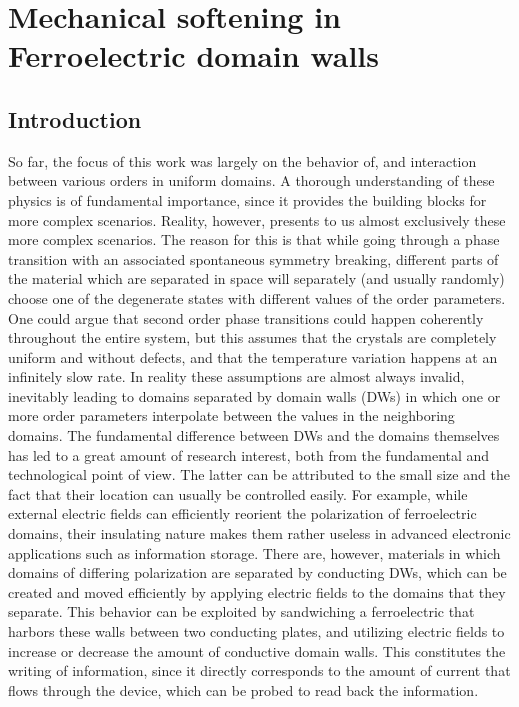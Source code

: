 \chapter{Mechanical softening in Ferroelectric domain walls}


\section{Introduction}
So far, the focus of this work was largely on the behavior of, and interaction between various orders in uniform domains.
A thorough understanding of these physics is of fundamental importance, since it provides the building blocks for more complex scenarios.
Reality, however, presents to us almost exclusively these more complex scenarios.
The reason for this is that while going through a phase transition with an associated spontaneous symmetry breaking, different parts of the material which are separated in space will separately (and usually randomly) choose one of the degenerate states with different values of the order parameters.
One could argue that second order phase transitions could happen coherently throughout the entire system, but this assumes that the crystals are completely uniform and without defects, and that the temperature variation happens at an infinitely slow rate.
In reality these assumptions are almost always invalid, inevitably leading to domains separated by domain walls (DWs) in which one or more order parameters interpolate between the values in the neighboring domains.
The fundamental difference between DWs and the domains themselves has led to a great amount of research interest, both from the fundamental and technological point of view.
The latter can be attributed to the small size and the fact that their location can usually be controlled easily.
For example, while external electric fields can efficiently reorient the polarization of ferroelectric domains, their insulating nature makes them rather useless in advanced electronic applications such as information storage.
There are, however, materials in which domains of differing polarization are separated by conducting DWs, which can be created and moved efficiently by applying electric fields to the domains that they separate.
This behavior can be exploited by sandwiching a ferroelectric that harbors these walls between two conducting plates, and utilizing electric fields to increase or decrease the amount of conductive domain walls. This constitutes the writing of information, since it directly corresponds to the amount of current that flows through the device, which can be probed to read back the information. 

